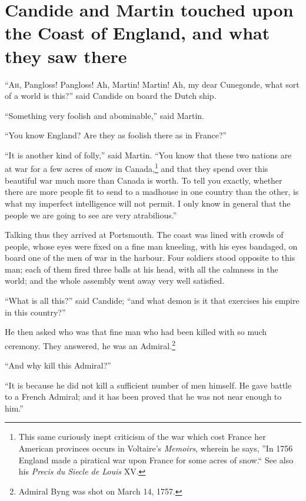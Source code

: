 \vspace{1cm}
\begingroup
\let\clearpage\relax
\chapter{Candide and Martin touched upon the Coast of England, and what they saw there}
\endgroup
\vspace{-1cm}
\lettrine[lraise=0.1,nindent=0em,slope=-.5em]{``A}{h}, Pangloss! Pangloss! Ah, Martin! Martin! Ah, my dear Cunegonde, what sort of a world is this?'' said Candide on board the Dutch ship.

``Something very foolish and abominable,'' said Martin.

``You know England? Are they as foolish there as in France?''

``It is another kind of folly,'' said Martin. ``You know that these two nations are at war for a few acres of snow in Canada,\footnote{This same curiously inept criticism of the war which cost France her American provinces occurs in Voltaire's \textit{Memoirs}, wherein he says, ''In 1756 England made a piratical war upon France for some acres of snow.`` See also his \textit{Precis du Siecle de Louis} XV.} and that they spend over this beautiful war much more than Canada is worth. To tell you exactly, whether there are more people fit to send to a madhouse in one country than the other, is what my imperfect intelligence will not permit. I only know in general that the people we are going to see are very atrabilious.''

Talking thus they arrived at Portsmouth. The coast was lined with crowds of people, whose eyes were fixed on a fine man kneeling, with his eyes bandaged, on board one of the men of war in the harbour. Four soldiers stood opposite to this man; each of them fired three balls at his head, with all the calmness in the world; and the whole assembly went away very well satisfied.

``What is all this?'' said Candide; ``and what demon is it that exercises his empire in this country?''

He then asked who was that fine man who had been killed with so much ceremony. They answered, he was an Admiral.\footnote{Admiral Byng was shot on March 14, 1757.}

``And why kill this Admiral?''

``It is because he did not kill a sufficient number of men himself. He gave battle to a French Admiral; and it has been proved that he was not near enough to him.''


